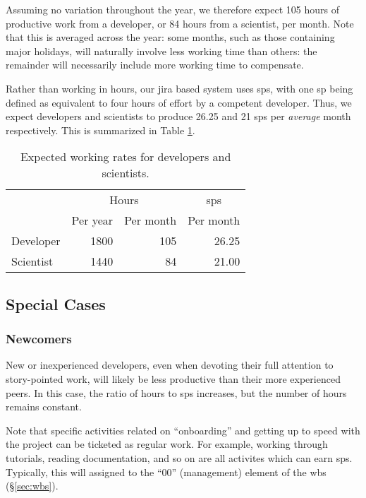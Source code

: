 Assuming no variation throughout the year, we therefore expect 105 hours of productive work from a developer, or 84 hours from a scientist, per month.
Note that this is averaged across the year: some months, such as those containing major holidays, will naturally involve less working time than others: the remainder will necessarily include more working time to compensate.

Rather than working in hours, our \gls{jira} based system uses \glspl{sp}, with one \gls{sp} being defined as equivalent to four hours of effort by a competent developer.
Thus, we expect developers and scientists to produce 26.25 and 21 \glspl{sp} per \emph{average} month respectively.
This is summarized in Table \ref{tab:working-rate}.

\begin{table}
\begin{longtable}[]{@{}lrrr@{}}
\hline
          & \multicolumn{2}{c}{Hours} & \multicolumn{1}{c}{\glspl{sp}} \\
          & Per year & Per month      & Per month \\
\hline
Developer & 1800     & 105            & 26.25 \\
Scientist & 1440     &  84            & 21.00 \\
\hline
\end{longtable}
\caption{Expected working rates for developers and scientists.}
\label{tab:working-rate}
\end{table}

\subsection{Special Cases}

\subsubsection{Newcomers}
\label{sec:newcomers}

New or inexperienced developers, even when devoting their full attention to story-pointed work, will likely be less productive than their more experienced peers.
In this case, the ratio of hours to \glspl{sp} increases, but the number of hours remains constant.

Note that specific activities related on ``onboarding'' and getting up to speed with the project can be ticketed as regular work.
For example, working through tutorials, reading documentation, and so on are all activites which can earn \glspl{sp}.
Typically, this will assigned to the ``00'' (management) element of the \gls{wbs} (\S\ref{sec:wbs}).

